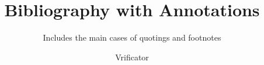 \documentclass[
  DIV=calc,
  BCOR=5mm,
  11pt,
  headings=small,
  oneside,
  abstract=true,
  toc=bib,
  ngerman,english]{scrartcl}
\begin{document}
\nocite{*}
\titlehead{Testing the Bibliography}
\subject{For evaluating \itshape{the complete bibliography}}
\title{Bibliography with Annotations}
\subtitle{Includes the main cases of quotings and footnotes}
\author{Vrificator}

\maketitle


\end{document}
